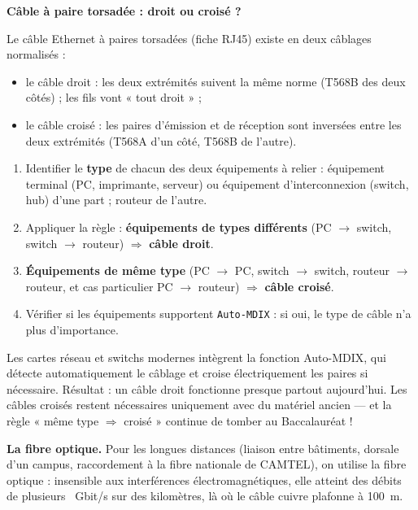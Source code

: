 \documentclass[11pt]{article}
\newcommand{\cle}[1]{{\popxbold\color{popdark}#1}}
\begin{document}
\textbf{Câble à paire torsadée : droit ou croisé ?}\par

Le câble Ethernet à paires torsadées (fiche RJ45) existe en deux câblages normalisés :

\begin{itemize}
  \item le \cle{câble droit} : les deux extrémités suivent la même norme (T568B des deux côtés) ; les fils vont « tout droit » ;
  \item le \cle{câble croisé} : les paires d'émission et de réception sont inversées entre les deux extrémités (T568A d'un côté, T568B de l'autre).
\end{itemize}

\begin{methode}
\begin{enumerate}
  \item Identifier le \textbf{type} de chacun des deux équipements à relier : équipement terminal (PC, imprimante, serveur) ou équipement d'interconnexion (switch, hub) d'une part ; routeur de l'autre.
  \item Appliquer la règle : \textbf{équipements de types différents} (PC $\to$ switch, switch $\to$ routeur) $\Rightarrow$ \textbf{câble droit}.
  \item \textbf{Équipements de même type} (PC $\to$ PC, switch $\to$ switch, routeur $\to$ routeur, et cas particulier PC $\to$ routeur) $\Rightarrow$ \textbf{câble croisé}.
  \item Vérifier si les équipements supportent \texttt{Auto-MDIX} : si oui, le type de câble n'a plus d'importance.
\end{enumerate}
\end{methode}

\begin{savaistu}
Les cartes réseau et switchs modernes intègrent la fonction \cle{Auto-MDIX}, qui détecte automatiquement le câblage et croise électriquement les paires si nécessaire. Résultat : un câble droit fonctionne presque partout aujourd'hui. Les câbles croisés restent nécessaires uniquement avec du matériel ancien — et la règle « même type $\Rightarrow$ croisé » continue de tomber au Baccalauréat !
\end{savaistu}

\textbf{La fibre optique.} Pour les longues distances (liaison entre bâtiments, dorsale d'un campus, raccordement à la fibre nationale de CAMTEL), on utilise la \cle{fibre optique} : insensible aux interférences électromagnétiques, elle atteint des débits de plusieurs \SI{}{Gbit/s} sur des kilomètres, là où le câble cuivre plafonne à \SI{100}{\metre}.
\end{document}
